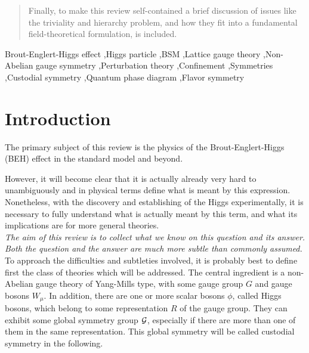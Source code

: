 \documentclass[final,12pt,3p,longtitle]{elsarticle}
\newcommand*{\1}{1\!\!\!\bot}
\begin{document}
\begin{frontmatter}
\begin{abstract}
Finally, to make this review self-contained a brief discussion of issues like the triviality and hierarchy problem, and how they fit into a fundamental field-theoretical formulation, is included.

\end{abstract}

\begin{keyword}
 Brout-Englert-Higgs effect \sep Higgs particle \sep BSM \sep Lattice gauge theory \sep Non-Abelian gauge symmetry \sep Perturbation theory \sep Confinement \sep Symmetries \sep Custodial symmetry \sep Quantum phase diagram \sep Flavor symmetry
\end{keyword}


\end{frontmatter}

\newpage
\setcounter{secnumdepth}{4}
\setcounter{tocdepth}{4}
\tableofcontents
\newpage

\section{Introduction}\label{sintro}

The primary subject of this review is the physics of the Brout-Englert-Higgs (BEH) effect \cite{Englert:1964et,Higgs:1964pj,Higgs:1964ia,Higgs:1966ev,Guralnik:1964eu} in the standard model and beyond.

However, it will become clear that it is actually already very hard to unambiguously and in physical terms define what is meant by this expression. Nonetheless, with the discovery \cite{Aad:2012tfa,Chatrchyan:2012ufa} and establishing \cite{pdg,Khachatryan:2016vau} of the Higgs experimentally, it is necessary to fully understand what is actually meant by this term, and what its implications are for more general theories.\\[0.5mm]

{\em The aim of this review is to collect what we know on this question and its answer. Both the question and the answer are much more subtle than commonly assumed.}\\[0.5mm]

To approach the difficulties and subtleties involved, it is probably best to define first the class of theories which will be addressed. The central ingredient is a non-Abelian gauge theory of Yang-Mills type, with some gauge group $G$ and gauge bosons $W_\mu$. In addition, there are one or more scalar bosons $\phi$, called Higgs bosons, which belong to some representation $R$ of the gauge group. They can exhibit some global symmetry group ${\cal G}$, especially if there are more than one of them in the same representation. This global symmetry will be called custodial symmetry in the following.
\end{document}

